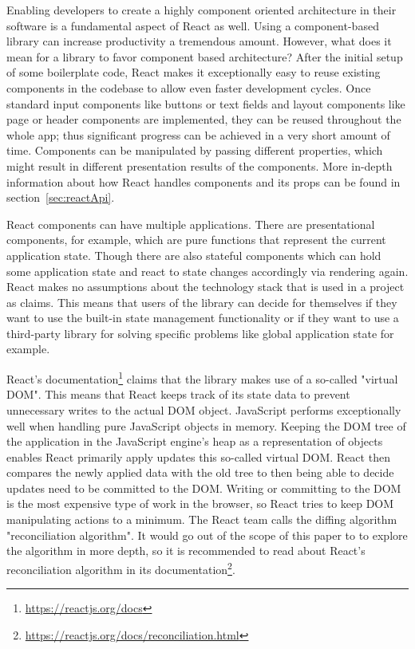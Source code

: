 Enabling developers to create a highly component oriented architecture in their software is a fundamental aspect of React as well. Using a component-based library can increase productivity a tremendous amount. However, what does it mean for a library to favor component based architecture? After the initial setup of some boilerplate code, React makes it exceptionally easy to reuse existing components in the codebase to allow even faster development cycles. Once standard input components like buttons or text fields and layout components like page or header components are implemented, they can be reused throughout the whole app; thus significant progress can be achieved in a very short amount of time. Components can be manipulated by passing different properties, which might result in different presentation results of the components. More in-depth information about how React handles components and its props can be found in section~\ref{sec:reactApi}.

React components can have multiple applications. There are presentational components, for example, which are pure functions that represent the current application state. Though there are also stateful components which can hold some application state and react to state changes accordingly via rendering again. React makes no assumptions about the technology stack that is used in a project as \cite{React} claims. This means that users of the library can decide for themselves if they want to use the built-in state management functionality or if they want to use a third-party library for solving specific problems like global application state for example.

React's documentation\footnote{\url{https://reactjs.org/docs}} claims that the library makes use of a so-called "virtual DOM". This means that React keeps track of its state data to prevent unnecessary writes to the actual DOM object. JavaScript performs exceptionally well when handling pure JavaScript objects in memory. Keeping the DOM tree of the application in the JavaScript engine's heap as a representation of objects enables React primarily apply updates this so-called virtual DOM. React then compares the newly applied data with the old tree to then being able to decide updates need to be committed to the DOM. Writing or committing to the DOM is the most expensive type of work in the browser, so React tries to keep DOM manipulating actions to a minimum. The React team calls the diffing algorithm "reconciliation algorithm". It would go out of the scope of this paper to to explore the algorithm in more depth, so it is recommended to read about React's reconciliation algorithm in its documentation\footnote{\url{https://reactjs.org/docs/reconciliation.html}}.

